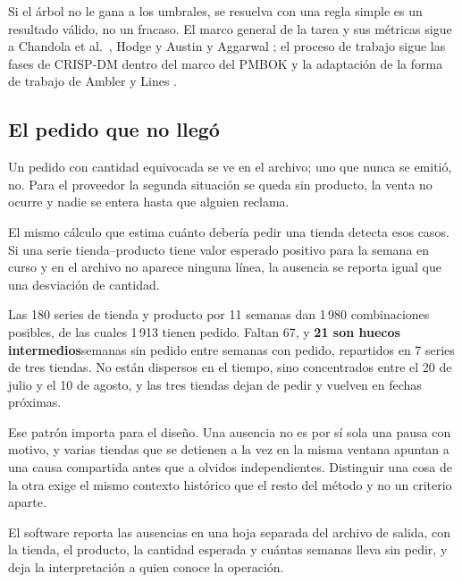 Si el árbol no le gana a los umbrales,  se resuelva con una regla simple es un resultado válido, no un fracaso. El marco general de la tarea y sus métricas sigue a Chandola et al.\ \cite{chandola2009}, Hodge y Austin \cite{hodge2004} y Aggarwal \cite{aggarwal2017}; el proceso de trabajo sigue las fases de CRISP-DM \cite{wirth2000} dentro del marco del PMBOK \cite{pmbok2025} y la adaptación de la forma de trabajo de Ambler y Lines \cite{ambler2023}.

\subsection{El pedido que no llegó}
\label{sec:ausencias}

Un pedido con cantidad equivocada se ve en el archivo; uno que nunca se emitió, no. Para el proveedor la segunda situación  se queda sin producto, la venta no ocurre y nadie se entera hasta que alguien reclama.

El mismo cálculo que estima cuánto debería pedir una tienda detecta esos casos. Si una serie tienda--producto tiene valor esperado positivo para la semana en curso y en el archivo no aparece ninguna línea, la ausencia se reporta igual que una desviación de cantidad.

Las 180 series de tienda y producto por 11 semanas dan 1\,980 combinaciones posibles, de las cuales 1\,913 tienen pedido. Faltan 67, y \textbf{21 son huecos intermedios}semanas sin pedido entre semanas con pedido, repartidos en 7 series de tres tiendas. No están dispersos en el tiempo, sino concentrados entre el 20 de julio y el 10 de agosto, y las tres tiendas dejan de pedir y vuelven en fechas próximas.

Ese patrón importa para el diseño. Una ausencia no es por sí sola  una pausa con motivo, y varias tiendas que se detienen a la vez en la misma ventana apuntan a una causa compartida antes que a olvidos independientes. Distinguir una cosa de la otra exige el mismo contexto histórico que el resto del método y no un criterio aparte.

El software reporta las ausencias en una hoja separada del archivo de salida, con la tienda, el producto, la cantidad esperada y cuántas semanas lleva sin pedir, y deja la interpretación a quien conoce la operación.

